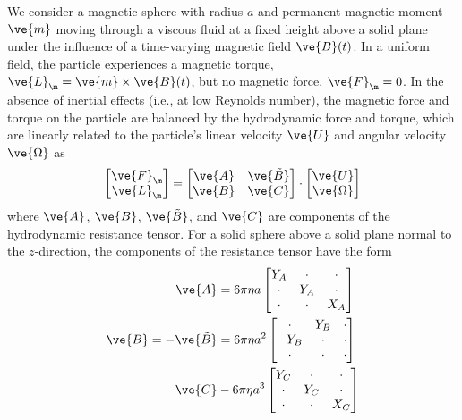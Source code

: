 We consider a magnetic sphere with radius $a$ and permanent magnetic moment $\ve{m}$ moving through a viscous fluid at a fixed height above a solid plane under the influence of a time-varying magnetic field $\ve{B}(t)$. In a uniform field, the particle experiences a magnetic torque, $\ve{L}_{\m}=\ve{m}\times\ve{B}(t)$, but no magnetic force, $\ve{F}_{\m}=0$. In the absence of inertial effects (i.e., at low Reynolds number), the magnetic force and torque on the particle are balanced by the hydrodynamic force and torque, which are linearly related to the particle's linear velocity $\ve{U}$ and angular velocity $\ve{\Omega}$ as
\begin{equation}
    \begin{bmatrix} \ve{F}_{\m} \\ \ve{L}_{\m} \end{bmatrix} = \begin{bmatrix} \ve{A} & \ve{\tilde{B}} \\ \ve{B} & \ve{C} \end{bmatrix}  \cdot \begin{bmatrix} \ve{U} \\ \ve{\Omega} \end{bmatrix} \label{eq:dynamics}
\end{equation}
where $\ve{A}$, $\ve{B}$, $\ve{\tilde{B}}$, and $\ve{C}$ are components of the hydrodynamic resistance tensor.  For a solid sphere above a solid plane normal to the $z$-direction, the components of the resistance tensor have the form
\begin{align}
    \ve{A} &=  6\pi \eta a \begin{bmatrix} 
        Y_A & \cdot & \cdot \\
        \cdot & Y_A & \cdot \\
        \cdot & \cdot & X_A  \end{bmatrix}
    \\
    \ve{B}=-\ve{\tilde{B}}&= 6\pi \eta a^2 \begin{bmatrix} 
        \cdot & Y_B & \cdot \\
        -Y_B & \cdot & \cdot \\
        \cdot & \cdot & \cdot  \end{bmatrix}
    \\
    \ve{C} &- 6\pi \eta a^3 \begin{bmatrix} 
        Y_C & \cdot & \cdot \\
        \cdot & Y_C & \cdot \\
        \cdot & \cdot & X_C  \end{bmatrix} 
\end{align}
